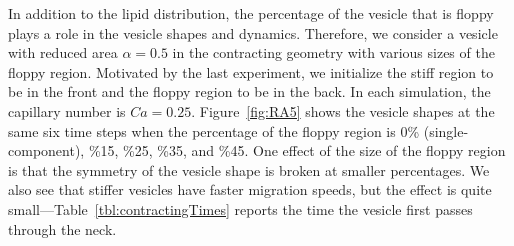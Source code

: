 \documentclass[twoside,twocolumn,9pt]{article}
\begin{document}

In addition to the lipid distribution, the percentage of the vesicle
that is floppy plays a role in the vesicle shapes and dynamics.
Therefore, we consider a vesicle with reduced area $\alpha = 0.5$ in the
contracting geometry with various sizes of the floppy region. Motivated
by the last experiment, we initialize the stiff region to be in the
front and the floppy region to be in the back. In each simulation, the
capillary number is $Ca = 0.25$. Figure~\ref{fig:RA5} shows the vesicle
shapes at the same six time steps when the percentage of the floppy
region is 0\% (single-component), \%15, \%25, \%35, and \%45. One effect
of the size of the floppy region is that the symmetry of the vesicle
shape is broken at smaller percentages. We also see that stiffer
vesicles have faster migration speeds, but the effect is quite
small---Table~\ref{tbl:contractingTimes} reports the time the vesicle
first passes through the neck.
\end{document}
